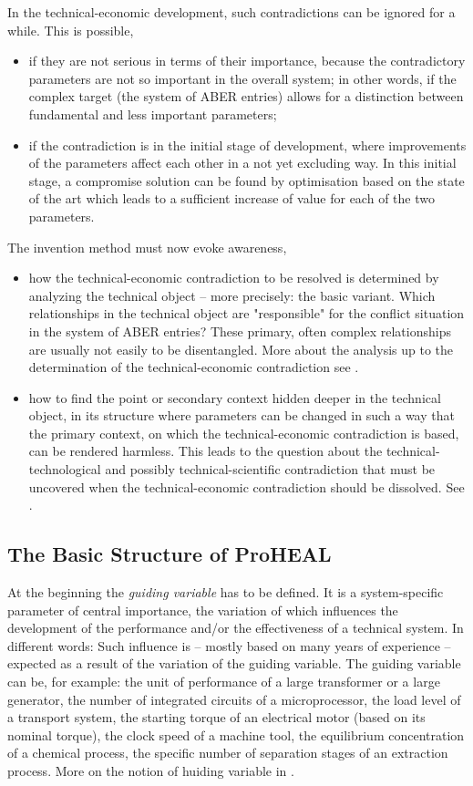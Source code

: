 \documentclass[11pt,a4paper]{article}
\begin{document}
In the technical-economic development, such contradictions can be ignored for
a while. This is possible,
\begin{itemize}
\item if they are not serious in terms of their importance, because the
  contradictory parameters are not so important in the overall system; in
  other words, if the complex target (the system of ABER entries) allows for a
  distinction between fundamental and less important parameters;
\item if the contradiction is in the initial stage of development, where
  improvements of the parameters affect each other in a not yet excluding way.
  In this initial stage, a compromise solution can be found by optimisation
  based on the state of the art which leads to a sufficient increase of value
  for each of the two parameters.
\end{itemize}

The invention method must now evoke awareness,
\begin{itemize}
\item how the technical-economic contradiction to be resolved is determined by
  analyzing the technical object -- more precisely: the basic variant.  Which
  relationships in the technical object are "responsible" for the conflict
  situation in the system of ABER entries?  These primary, often complex
  relationships are usually not easily to be disentangled. More about the
  analysis up to the determination of the technical-economic contradiction see
  \cite[A.1--A.4]{RM-21}.
\item how to find the point or secondary context hidden deeper in the
  technical object, in its structure where parameters can be changed in such a
  way that the primary context, on which the technical-economic contradiction
  is based, can be rendered harmless. This leads to the question about the
  technical-technological and possibly technical-scientific contradiction that
  must be uncovered when the technical-economic contradiction should be
  dissolved.  See \cite[A.5--A.9]{RM-21}.
\end{itemize}

\subsection{The Basic Structure of ProHEAL}
  
At the beginning the \emph{guiding variable} has to be defined. It is a
system-specific parameter of central importance, the variation of which
influences the development of the performance and/or the effectiveness of a
technical system. In different words: Such influence is -- mostly based on
many years of experience -- expected as a result of the variation of the
guiding variable. The guiding variable can be, for example: the unit of
performance of a large transformer or a large generator, the number of
integrated circuits of a microprocessor, the load level of a transport system,
the starting torque of an electrical motor (based on its nominal torque), the
clock speed of a machine tool, the equilibrium concentration of a chemical
process, the specific number of separation stages of an extraction process.
More on the notion of huiding variable in \cite[(2.3.4)]{RM-21}.
\end{document}
